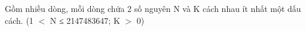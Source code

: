 Gồm nhiều dòng, mỗi dòng chứa 2 số nguyên N và K cách nhau ít nhất một dấu cách. (1 $<$ N ≤ 2147483647; K $>$ 0)